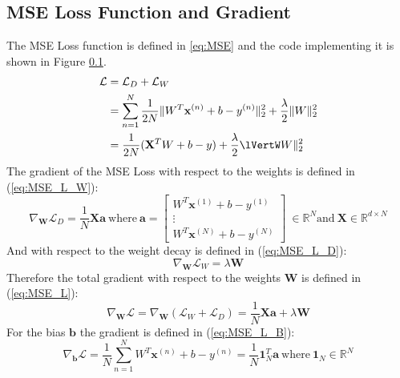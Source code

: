 \documentclass{article}
\newcommand{\R}{\mathbb{R}}
\begin{document}
\subsection{MSE Loss Function and Gradient}
The MSE Loss function is defined in \ref{eq:MSE} and the code implementing it is shown in Figure \ref{}.
\begin{equation} \label{eq:MSE}
    \begin{split}
        \mathcal{L} & = \mathcal{L}_D + \mathcal{L}_W \\
          & = \sum_{n=1}^{N} \frac{1}{2N} 
          \lVert W^T\mathbf{x}^{(n)}+b-y^{(n)} \rVert_{2}^{2} 
          + \frac{\lambda}{2} \lVert W \rVert_{2}^{2} \\
          & = \frac{1}{2N}(\mathbf{X}^TW + b - y) + \frac{\lambda}{2} \lVertW W \rVert_{2}^2
    \end{split}
\end{equation}
The gradient of the MSE Loss with respect to the weights is defined in (\ref{eq:MSE_L_W}):
\begin{equation} \label{eq:MSE_L_W}
    \nabla_{\mathbf{W}}\mathcal{L}_D = \frac{1}{N} \mathbf{X}\mathbf{a} \
    \textrm{where} \ 
    \mathbf{a} = \begin{bmatrix}
        W^{T}\mathbf{x}^{(1)}+b-y^{(1)} \\ \vdots \\ W^{T}\mathbf{x}^{(N)}+b-y^{(N)} 
    \end{bmatrix} \
    \in \R^{N} \textrm{and} \ \mathbf{X} \in \R^{d \times N}
\end{equation}   
And with respect to the weight decay is defined in (\ref{eq:MSE_L_D}):
\begin{equation} \label{eq:MSE_L_D}
    \nabla_{\mathbf{W}}\mathcal{L}_W = \lambda \mathbf{W}
\end{equation}
Therefore the total gradient with respect to the weights $\mathbf{W}$ is defined in (\ref{eq:MSE_L}):
\begin{equation} \label{eq:MSE_L}
    \nabla_{\mathbf{W}}\mathcal{L} = \nabla_\mathbf{W}(\mathcal{L}_W + \mathcal{L}_D) = \frac{1}{N}\mathbf{X}\mathbf{a} + \lambda \mathbf{W}
\end{equation}
For the bias $\mathbf{b}$ the gradient is defined in (\ref{eq:MSE_L_B}):
\begin{equation} \label{eq:MSE_L_B}
    \nabla_\mathbf{b}\mathcal{L} = 
    \frac{1}{N} \sum_{n=1}^{N} W^{T}\mathbf{x}^{(n)}+b-y^{(n)}
    = \frac{1}{N} \mathbf{1}_N^T\mathbf{a} \ \textrm{where} \ \mathbf{1}_N \in \R^N
\end{equation}
\end{document}
